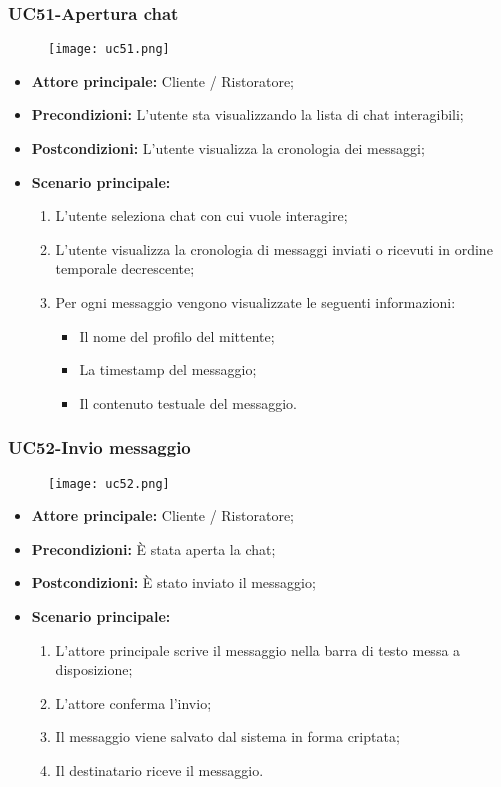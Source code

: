 \pagebreak

\subsubsection{UC51-Apertura chat}
\begin{figure}[h] \texttt{[image: uc51.png]} \end{figure}
\begin{itemize}
\item \textbf{Attore principale:} Cliente / Ristoratore;
\item \textbf{Precondizioni:} L'utente sta visualizzando la lista di chat interagibili;
\item \textbf{Postcondizioni:} L'utente visualizza la cronologia dei messaggi;
\item \textbf{Scenario principale:}
\begin{enumerate}
    \item L'utente seleziona chat con cui vuole interagire;
    \item L'utente visualizza la cronologia di messaggi inviati o ricevuti in ordine temporale decrescente;
    \item Per ogni messaggio vengono visualizzate le seguenti informazioni:
      \begin{itemize}
        \item Il nome del profilo del mittente;
        \item La timestamp del messaggio;
        \item Il contenuto testuale del messaggio.
      \end{itemize}
\end{enumerate}
\end{itemize}

\subsubsection{UC52-Invio messaggio}
\begin{figure}[h] \texttt{[image: uc52.png]} \end{figure}
\begin{itemize}
\item \textbf{Attore principale:} Cliente / Ristoratore;
\item \textbf{Precondizioni:} È stata aperta la chat;
\item \textbf{Postcondizioni:} È stato inviato il messaggio;
\item \textbf{Scenario principale:}
\begin{enumerate}
    \item L'attore principale scrive il messaggio nella barra di testo messa a disposizione;
    \item L'attore conferma l'invio;
    \item Il messaggio viene salvato dal sistema in forma criptata;
    \item Il destinatario riceve il messaggio.
\end{enumerate}
\end{itemize}
